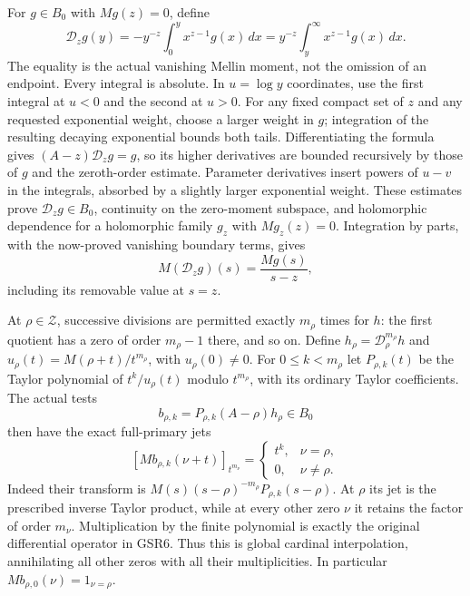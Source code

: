 For $g\in B_0$ with $Mg(z)=0$, define
\begin{equation}\tag{GSR4}
 \mathcal D_zg(y)=
    -y^{-z}\int_0^y x^{z-1}g(x)\,dx
     =y^{-z}\int_y^\infty x^{z-1}g(x)\,dx .
\end{equation}
The equality is the actual vanishing Mellin moment,
not the omission of an endpoint. Every integral is
absolute. In $u=\log y$ coordinates, use the first
integral at $u<0$ and the second at $u>0$. For any
fixed compact set of $z$ and any requested exponential
weight, choose a larger weight in $g$; integration of
the resulting decaying exponential bounds both tails.
Differentiating the formula gives
$(A-z)\mathcal D_zg=g$, so its higher derivatives
are bounded recursively by those of $g$ and the
zeroth-order estimate. Parameter derivatives insert
powers of $u-v$ in the integrals, absorbed by a
slightly larger exponential weight. These estimates
prove $\mathcal D_zg\in B_0$, continuity on the
zero-moment subspace, and holomorphic dependence
for a holomorphic family $g_z$ with $Mg_z(z)=0$.
Integration by parts, with the now-proved vanishing
boundary terms, gives
\begin{equation}\tag{GSR5}
 M(\mathcal D_zg)(s)=\frac{Mg(s)}{s-z},
\end{equation}
including its removable value at $s=z$.

At $\rho\in\mathcal Z$, successive divisions are
permitted exactly $m_\rho$ times for $h$:
the first quotient has a zero of order $m_\rho-1$
there, and so on. Define
$h_\rho=\mathcal D_\rho^{m_\rho}h$ and
$u_\rho(t)=M(\rho+t)/t^{m_\rho}$, with
$u_\rho(0)\ne0$. For $0\le k<m_\rho$ let
$P_{\rho,k}(t)$ be the Taylor polynomial of
$t^k/u_\rho(t)$ modulo $t^{m_\rho}$, with its
ordinary Taylor coefficients. The actual tests
\begin{equation}\tag{GSR6}
 b_{\rho,k}=P_{\rho,k}(A-\rho)h_\rho\in B_0
\end{equation}
then have the exact full-primary jets
\begin{equation}\tag{GSR7}
 \left[Mb_{\rho,k}(\nu+t)\right]_{t^{m_\nu}}
  =\begin{cases}t^k,&\nu=\rho,\\0,&\nu\ne\rho.\end{cases}
\end{equation}
Indeed their transform is
$M(s)(s-\rho)^{-m_\rho}P_{\rho,k}(s-\rho)$.
At $\rho$ its jet is the prescribed inverse Taylor
product, while at every other zero $\nu$ it retains
the factor of order $m_\nu$. Multiplication by
the finite polynomial is exactly the original
differential operator in GSR6. Thus this is
global cardinal interpolation, annihilating all
other zeros with all their multiplicities.
In particular $Mb_{\rho,0}(\nu)=1_{\nu=\rho}$.

